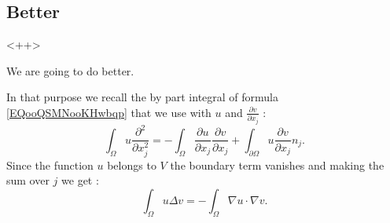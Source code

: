 \subsection{Better}

<++>

We are going to do better.

In that purpose we recall the by part integral of formula \eqref{EQooQSMNooKHwbqp} that we use with \( u\) and  \( \frac{ \partial v }{ \partial x_j }\) :
\begin{equation}
    \int_{\Omega}u\frac{ \partial^2 }{ \partial x_j^2 }=-\int_{\Omega}\frac{ \partial u }{ \partial x_j }\frac{ \partial v }{ \partial x_j }+\int_{\partial \Omega}u\frac{ \partial v }{ \partial x_j }n_j.
\end{equation}
Since the function \( u\) belongs to \( V\) the boundary term vanishes and making the sum over \( j\) we get :
\begin{equation}
    \int_{\Omega}u\Delta v=-\int_{\Omega}\nabla u\cdot \nabla v.
\end{equation}
